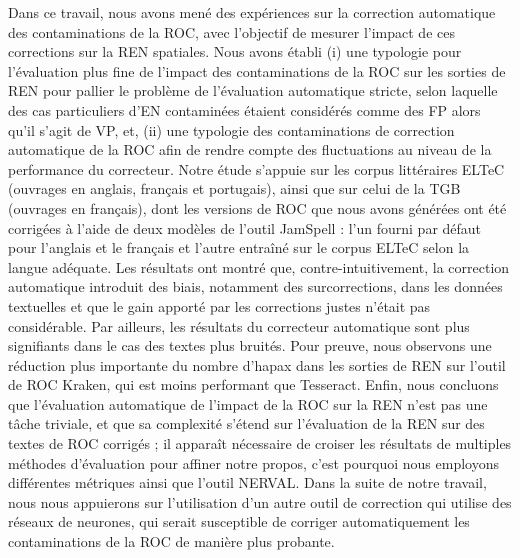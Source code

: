 Dans ce travail, nous avons mené des expériences sur la correction automatique des contaminations de la ROC, avec l'objectif de mesurer l'impact de ces corrections sur la REN spatiales. Nous avons établi (i) une typologie pour l'évaluation plus fine de l'impact des contaminations de la ROC sur les sorties de REN pour pallier le problème de l'évaluation automatique stricte, selon laquelle des cas particuliers d'EN contaminées étaient considérés comme des FP alors qu'il s'agit de VP, et, (ii) une typologie des contaminations de correction automatique de la ROC afin de rendre compte des fluctuations au niveau de la performance du correcteur. Notre étude s'appuie sur les corpus littéraires ELTeC (ouvrages en anglais, français et portugais), ainsi que sur celui de la TGB (ouvrages en français), dont les versions de ROC que nous avons générées ont été corrigées à l'aide de deux modèles de l'outil JamSpell : l'un fourni par défaut pour l'anglais et le français et l'autre entraîné sur le corpus ELTeC selon la langue adéquate. Les résultats ont montré que, contre-intuitivement, la correction automatique introduit des biais, notamment des surcorrections, dans les données textuelles et que le gain apporté par les corrections justes n'était pas considérable.  Par ailleurs, les résultats du correcteur automatique sont plus signifiants dans le cas des textes plus bruités. Pour preuve, nous observons une réduction plus importante du nombre d'hapax dans les sorties de REN sur l'outil de ROC Kraken, qui est moins performant que Tesseract. Enfin, nous concluons que l'évaluation automatique de l'impact de la ROC sur la REN n'est pas une tâche triviale, et que sa complexité s'étend sur l'évaluation de la REN sur des textes de ROC corrigés ; il apparaît nécessaire de croiser les résultats de multiples méthodes d'évaluation pour affiner notre propos, c'est pourquoi nous employons différentes métriques ainsi que l'outil \textsc{NERVAL}. Dans la suite de notre travail, nous nous appuierons sur l'utilisation d'un autre outil de correction qui utilise des réseaux de neurones, qui serait susceptible de corriger automatiquement les contaminations de la ROC de manière plus probante.


